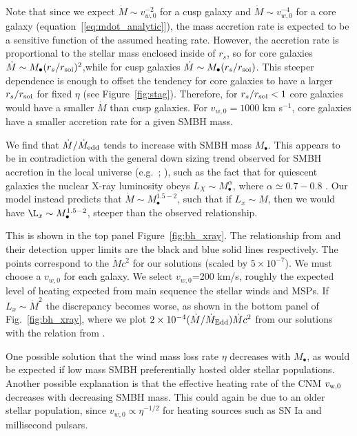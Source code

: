 \documentclass[usenatbib,fleqn]{mn2e}
\newcommand{\Mdot}{\dot{M}}
\newcommand{\eddr}{\dot{M}/\dot{M}_{\rm Edd}}
\newcommand{\rs}{r_s}
\newcommand{\Mbh}[1][]{M_{\bullet#1}}
\newcommand{\soi}{\rm soi}
\newcommand{\rsoi}{r_{\soi}}
\newcommand{\vwO}{v_{w,0}}
\begin{document}
Note that since we expect $\dot{M}\sim\vwO^{-2}$ for a cusp galaxy and
$\dot{M}\sim\vwO^{-4}$ for a core galaxy
(equation~[\ref{eq:mdot_analytic}]), the mass accretion rate is
expected to be a sensitive function of the assumed heating rate.
However, the accretion rate is proportional to the stellar mass
enclosed inside of $\rs$, so for core galaxies $\dot{M}\sim \Mbh
(\rs/\rsoi)^{2}$,while for cusp galaxies $\dot{M}\sim \Mbh
(\rs/\rsoi)$.  This steeper dependence is enough to offset the
tendency for core galaxies to have a larger $\rs/\rsoi$ for fixed
$\eta$ (see Figure~\ref{fig:stag}). Therefore, for $\rs/\rsoi<1$ core
galaxies would have a smaller $\dot{M}$ than cusp galaxies.  For
$\vwO=1000$ km s$^{-1}$, core galaxies have a smaller accretion rate
for a given SMBH mass.

We find that $\dot{M}/\dot{M}_{\rm edd}$ tends to increase with SMBH
mass $M_{\bullet}$.  This appears to be in contradiction with the
general down sizing trend observed for SMBH accretion in the local
universe (e.g.~\citealt{Heckman+04}; \citealt{Gallo+08}), such as the
fact that for quiescent galaxies the nuclear X-ray luminosity obeys
$L_X \sim \Mbh^\alpha$, where $\alpha\simeq 0.7-0.8$
\citep{MillerGallo+:2014a}.  Our model instead predicts that $\Mdot
\sim \Mbh^{1.5-2}$, such that if $L_x\sim M$, then we would have $\L_x
\sim \Mbh^{1.5-2}$, steeper than the observed relationship. 

This is shown in the top panel Figure~\ref{fig:bh_xray}. The
relationship from \citealt{MillerGallo+:2014a} and their detection
upper limits are the black and blue solid lines
respectively. The points correspond to the $\dot{M} c^2$ for our
solutions (scaled by $5\times 10^{-7}$).  We must choose a $\vwO$ for
each galaxy.  We select $\vwO$=200 km/s, roughly the expected level of
heating expected from main sequence the stellar winds and MSPs. If
$L_x \sim \Mdot^2$ the discrepancy becomes worse, as shown in the
bottom panel of Fig.~\ref{fig:bh_xray}, where we plot $2 \times
10^{-4} (\eddr) \Mdot c^2$ from our solutions with the relation from
\citealt{MillerGallo+:2014a}.


One possible solution that the wind mass loss rate $\eta$ decreases
with $\Mbh$, as would be expected if low mass SMBH preferentially
hosted older stellar populations.  Another possible explanation is
that the effective heating rate of the CNM $v_{\rm w,0}$ decreases
with decreasing SMBH mass.  This could again be due to an older
stellar population, since $v_{w,0} \propto \eta^{-1/2}$ for heating
sources such as SN Ia and millisecond pulsars.
\end{document}
